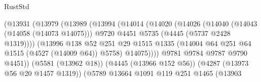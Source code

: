 \begin{lexlean}{RustStd}
\begin{coremodule}
                                          (@13931
                                            (@13979
                                              (@13989
                                                (@13994
                                                  (@14014
                                                    (@14020
                                                      (@14026
                                                        (@14040
                                                          (@14043 (@14058 (@14073 @14075)))
                                                          @9720
                                                          @4451
                                                          @5735
                                                          (@4445 (@5737 @2428 @1319))))
                                                      (@13996
                                                        @138
                                                        @52
                                                        @251
                                                        @29
                                                        @1515
                                                        @1335
                                                        (@14004
                                                          @64
                                                          @251
                                                          @64
                                                          @1515
                                                          (@4527 (@14009 @64))
                                                          @5758)
                                                        @14075))))
                                                @9781
                                                @9784
                                                @9787
                                                @9790
                                                @4451))
                                            (@5581 (@13962 @18))
                                            (@4445 (@13966 @152 @56))
                                            (@4287 (@13973 @56 @20 @1457 @1319))
                                            (@5789
                                              @13664
                                              @1091
                                              @119
                                              @251
                                              @1465
                                              (@13903

\end{coremodule}
\end{lexlean}
